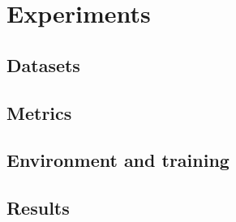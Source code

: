 \chapter{Experiments}

\section{Datasets}
\section{Metrics}
\section{Environment and training}
\section{Results}
